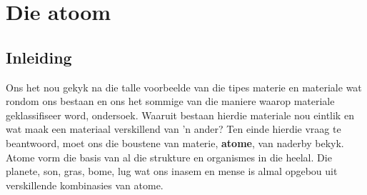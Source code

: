          \chapter{Die atoom}
\label{chap:atom}
    \setcounter{figure}{1}
    \setcounter{subfigure}{1}
    \label{ea1c9e59656f96ee804546971cf6dee6}
    \label{m38756*cid1}
            \section{Inleiding}
            \nopagebreak
  
      \par \label{m38756*id254141}Ons het nou gekyk na die talle voorbeelde van die tipes materie en materiale wat rondom ons bestaan
en ons het sommige van die maniere waarop materiale geklassifiseer word, ondersoek. Waaruit bestaan hierdie materiale nou eintlik en wat maak een materiaal verskillend van  'n ander? Ten einde hierdie vraag te beantwoord, moet ons die boustene van materie, \textbf{atome}, van naderby bekyk. Atome vorm die basis van al die strukture en organismes in die heelal. Die planete, son, gras, bome, lug wat ons inasem en mense is almal opgebou uit verskillende kombinasies van atome.\par 
            




